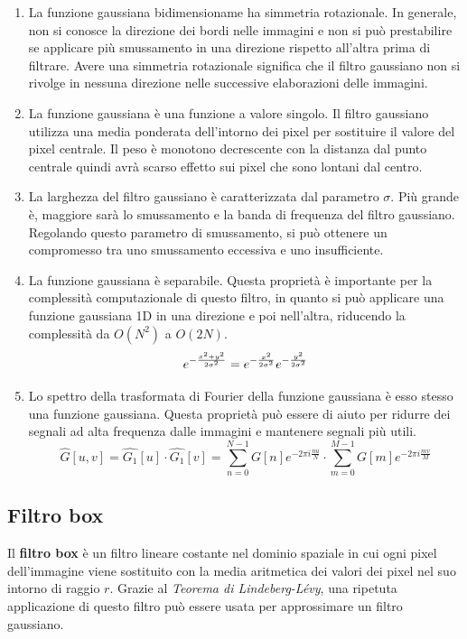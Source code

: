\documentclass[../main.tex]{subfiles}
\begin{document}
\begin{enumerate}
	\itemsep0em
	\item La funzione gaussiana bidimensioname ha simmetria rotazionale. In generale, non si conosce la direzione dei bordi nelle immagini e non si può prestabilire se applicare più smussamento in una direzione rispetto all'altra prima di filtrare. Avere una simmetria rotazionale significa che il filtro gaussiano non si rivolge in nessuna direzione nelle successive elaborazioni delle immagini.
	\item La funzione gaussiana è una funzione a valore singolo. Il filtro gaussiano utilizza una media ponderata dell'intorno dei pixel per sostituire il valore del pixel centrale. Il peso è monotono decrescente con la distanza dal punto centrale quindi avrà scarso effetto sui pixel che sono lontani dal centro.
	\item La larghezza del filtro gaussiano è caratterizzata dal parametro $\sigma$. Più grande è, maggiore sarà lo smussamento e la banda di frequenza del filtro gaussiano. Regolando questo parametro di smussamento, si può ottenere un compromesso tra uno smussamento eccessiva e uno insufficiente.
	\item La funzione gaussiana è separabile. Questa proprietà è importante per la complessità computazionale di questo filtro, in quanto si può applicare una funzione gaussiana 1D in una direzione e poi nell'altra, riducendo la complessità da $O(N^2)$ a $O(2N)$.
	\begin{equation}
		e^{\large-\frac{x^2+y^2}{2\sigma^2}}=e^{\large-\frac{x^2}{2\sigma^2}}e^{\large-\frac{y^2}{2\sigma^2}}
	\end{equation}
	\item Lo spettro della trasformata di Fourier della funzione gaussiana è esso stesso una funzione gaussiana. Questa proprietà può essere di aiuto per ridurre dei segnali ad alta frequenza dalle immagini e mantenere segnali più utili.
	\begin{equation}
		\hat{G}[u,v] = \hat{G_1}[u]\cdot\hat{G_1}[v] = \sum_{n=0}^{N-1}G[n]e^{-2\pi i\frac{nu}{N}}\cdot\sum_{m=0}^{M-1}G[m]e^{-2\pi i\frac{mv}{M}}
	\end{equation}
\end{enumerate}

\subsection{Filtro box}

Il \textbf{filtro box} è un filtro lineare costante nel dominio spaziale in cui ogni pixel dell'immagine viene sostituito con la media aritmetica dei valori dei pixel nel suo intorno di raggio $r$. Grazie al \textit{Teorema di Lindeberg-Lévy}, una ripetuta applicazione di questo filtro può essere usata per approssimare un filtro gaussiano.\cite{getreuer_2013}
\end{document}
